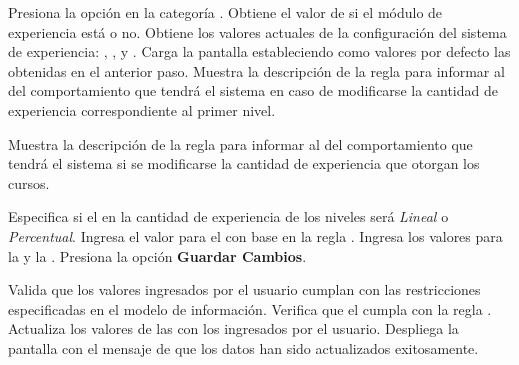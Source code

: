 \begin{UCtrayectoria}%
%
   

  \Actor Presiona la opción {\bf {}} en la categoría
         .  
  \Sistema Obtiene el valor de si el módulo de experiencia está  o no.  \label{CU-E02-2-loading}
  \Sistema Obtiene los valores actuales de la configuración del sistema de experiencia:
           ,
           ,
            y
           .
  \Sistema Carga la pantalla  estableciendo como valores por defecto
           las  obtenidas en el anterior paso.
  \Sistema Muestra la descripción de la regla  para informar al 
            del comportamiento que tendrá el sistema en 
           caso de modificarse la cantidad de experiencia correspondiente al primer
           nivel.

  \Sistema Muestra la descripción de la regla  para informar al 
            del comportamiento que tendrá el sistema si se 
           modificarse la cantidad de experiencia que otorgan los cursos.

  \Actor Especifica si el  en la cantidad de
         experiencia de los niveles será {\it Lineal} o {\it Percentual}.
  \Actor Ingresa el valor para el  con
         base en la regla .
  \Actor Ingresa los valores para la  y la
         .
  \Actor Presiona la opción {\bf Guardar Cambios}.  \label{CU-E02-2-submit}

  \Sistema Valida que los valores ingresados por el usuario cumplan con las
           restricciones especificadas en el modelo de información.
  \Sistema Verifica que el  cumpla
           con la regla . 
  \Sistema Actualiza los valores de las  con los
           ingresados por el usuario.
  \Sistema Despliega la pantalla  con el mensaje de que los datos
           han sido actualizados exitosamente.

\end{UCtrayectoria}

